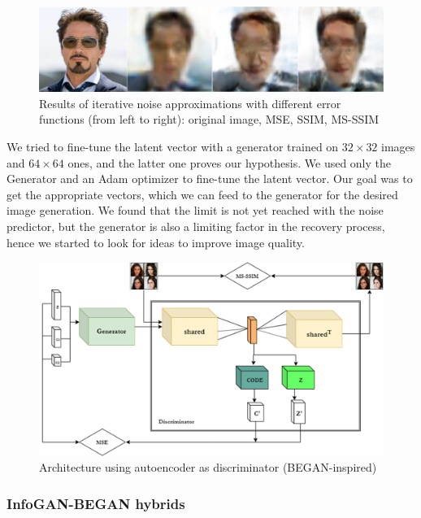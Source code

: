 \documentclass{egpubl}
\begin{document}
\begin{figure}[!htb]
	\centering
	\includegraphics[width=\linewidth]{pic/tony_iterative}
	\caption{Results of iterative noise approximations with different error functions (from left to right): original image, MSE, SSIM, MS-SSIM}
	\label{fig:tony_iterative}
\end{figure}

We tried to fine-tune the latent vector with a generator trained on $32\times 32$ images and $64\times 64$ ones, and the latter one proves our hypothesis. We used only the Generator and an Adam optimizer to fine-tune the latent vector. Our goal was to get the appropriate vectors, which we can feed to the generator for the desired image generation. We found that the limit is not yet reached with the noise predictor, but the generator is also a limiting factor in the recovery process, hence we started to look for ideas to improve image quality.

\begin{figure}[!htb]
	\centering
	\includegraphics[width=\linewidth]{pic/3}
	\caption{Architecture using autoencoder as discriminator (BEGAN-inspired)}
	\label{fig:infogan_ae}
\end{figure}

\subsubsection{InfoGAN-BEGAN hybrids}
\end{document}
